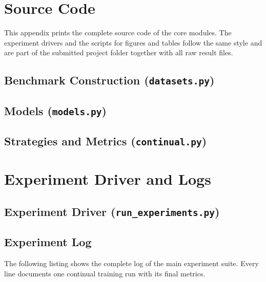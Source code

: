 \chapter{Source Code}
\label{chap:code}

This appendix prints the complete source code of the core modules. The
experiment drivers and the scripts for figures and tables follow the same
style and are part of the submitted project folder together with all raw
result files.

\section{Benchmark Construction (\texttt{datasets.py})}


\section{Models (\texttt{models.py})}


\section{Strategies and Metrics (\texttt{continual.py})}


\chapter{Experiment Driver and Logs}
\label{chap:logs}

\section{Experiment Driver (\texttt{run\_experiments.py})}


\section{Experiment Log}
\label{sec:fulllog}
The following listing shows the complete log of the main experiment suite.
Every line documents one continual training run with its final metrics.


